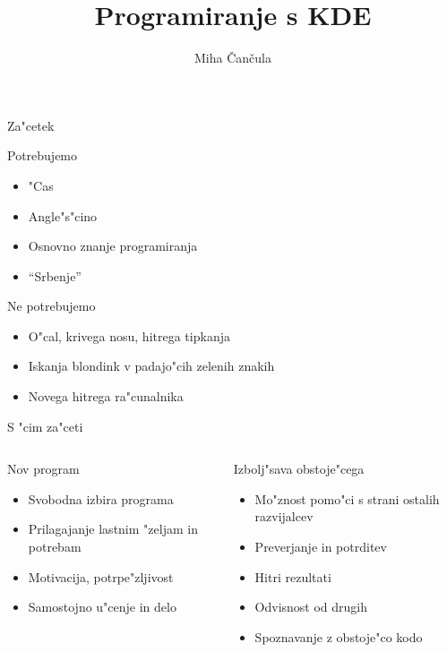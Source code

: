 \documentclass{beamer}
\title{Programiranje s KDE}
\author{Miha \v Can\v cula}
\begin{document}
\frame{\titlepage}

\begin{frame}{Za"cetek}
  \begin{block}{Potrebujemo}
    \begin{itemize}
      \item "Cas
      \item Angle"s"cino
      \item Osnovno znanje programiranja
      \item ``Srbenje''
    \end{itemize}
  \end{block}
  \begin{block}{Ne potrebujemo}
    \begin{itemize}
      \item O"cal, krivega nosu, hitrega tipkanja
      \item Iskanja blondink v padajo"cih zelenih znakih
      \item Novega hitrega ra"cunalnika
    \end{itemize}
  \end{block}
\end{frame}

\begin{frame}{S "cim za"ceti}
 \begin{columns}
  \begin{column}{.47\textwidth}
   \begin{block}{Nov program}
    \begin{itemize}
     \item Svobodna izbira programa 
     \item Prilagajanje lastnim "zeljam in potrebam \\[.5cm]
     \item Motivacija, potrpe"zljivost
    \item Samostojno u"cenje in delo
    \end{itemize}
   \end{block}
  \end{column}
  \begin{column}{.5\textwidth}
   \begin{block}{Izbolj"sava obstoje"cega}
    \begin{itemize}
     \item Mo"znost pomo"ci s strani ostalih razvijalcev
     \item Preverjanje in potrditev
      \item Hitri rezultati \\[.5cm]
     \item Odvisnost od drugih
     \item Spoznavanje z obstoje"co kodo
    \end{itemize}
   \end{block}
  \end{column}
 \end{columns}
\end{frame}
\end{document}
